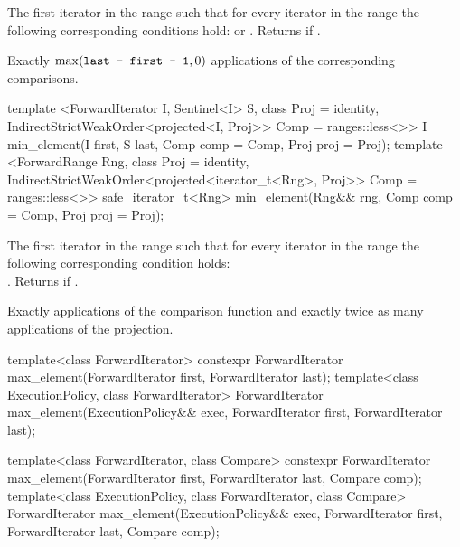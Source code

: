 \begin{itemdescr}
\pnum
\returns
The first iterator
in the range
such that for every iterator
in the range
the following corresponding conditions hold:
or
.
Returns
if
.

\pnum
\complexity
Exactly
$\max(\texttt{last - first - 1}, 0)$
applications of the corresponding comparisons.
\end{itemdescr}

\begin{addedblock}
%
\begin{itemdecl}
template <ForwardIterator I, Sentinel<I> S, class Proj = identity,
          IndirectStrictWeakOrder<projected<I, Proj>> Comp = ranges::less<>>
  I min_element(I first, S last, Comp comp = Comp{}, Proj proj = Proj{});
template <ForwardRange Rng, class Proj = identity,
          IndirectStrictWeakOrder<projected<iterator_t<Rng>, Proj>> Comp = ranges::less<>>
  safe_iterator_t<Rng> min_element(Rng&& rng, Comp comp = Comp{}, Proj proj = Proj{});
\end{itemdecl}

\begin{itemdescr}
\pnum
\returns
The first iterator
in the range
such that for every iterator
in the range
the following corresponding condition holds: \\
.
Returns
if
.

\pnum
\complexity
Exactly
applications of the comparison function and
exactly twice as many applications of the projection.
\end{itemdescr}
\end{addedblock}

%
\begin{itemdecl}
template<class ForwardIterator>
  constexpr ForwardIterator max_element(ForwardIterator first, ForwardIterator last);
template<class ExecutionPolicy, class ForwardIterator>
  ForwardIterator max_element(ExecutionPolicy&& exec,
                              ForwardIterator first, ForwardIterator last);

template<class ForwardIterator, class Compare>
  constexpr ForwardIterator max_element(ForwardIterator first, ForwardIterator last,
                                        Compare comp);
template<class ExecutionPolicy, class ForwardIterator, class Compare>
  ForwardIterator max_element(ExecutionPolicy&& exec,
                              ForwardIterator first, ForwardIterator last,
                              Compare comp);
\end{itemdecl}

